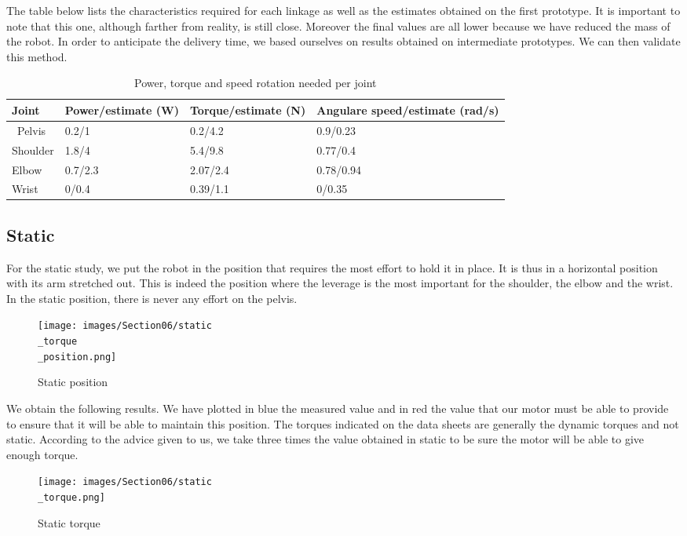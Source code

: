 \bigbreak
The table below lists the characteristics required for each linkage as well as the estimates obtained on the first prototype. It is important to note that this one, although farther from reality, is still close. Moreover the final values are all lower because we have reduced the mass of the robot. In order to anticipate the delivery time, we based ourselves on results obtained on intermediate prototypes. We can then validate this method. 

\begin{table}[ht]
    \centering
    \begin{tabular}{|p{1.5cm} | p{4cm} | p{4cm}|p{5cm} |} 
        \hline
        \textbf{Joint} & \textbf{Power/estimate (W)} & \textbf{Torque/estimate (N)}& \textbf{Angulare speed/estimate (rad/s)}\\ [0.3ex] 
        \hline\
        Pelvis & 0.2/1 & 0.2/4.2 & 0.9/0.23 \\ 
        \hline
        Shoulder & 1.8/4 & 5.4/9.8 & 0.77/0.4 \\ 
        \hline
        Elbow & 0.7/2.3 & 2.07/2.4 & 0.78/0.94 \\ 
        \hline
        Wrist & 0/0.4 & 0.39/1.1 & 0/0.35 \\ 
        \hline
    \end{tabular}
    \caption{Power, torque and speed rotation needed per joint}
\end{table}
\FloatBarrier

\subsection{Static}

For the static study, we put the robot in the position that requires the most effort to hold it in place. It is thus in a horizontal position with its arm stretched out. This is indeed the position where the leverage is the most important for the shoulder, the elbow and the wrist. In the static position, there is never any effort on the pelvis.
\begin{figure}[ht]
    \centering
    \texttt{[image: images/Section06/static\\\_torque\\\_position.png]}
    \caption{Static position}
    \label{fig:mesh15}
\end{figure}
\FloatBarrier

\bigbreak
We obtain the following results. We have plotted in blue the measured value and in red the value that our motor must be able to provide to ensure that it will be able to maintain this position. The torques indicated on the data sheets are generally the dynamic torques and not static. According to the advice given to us, we take three times the value obtained in static to be sure the motor will be able to give enough torque.
\begin{figure}[ht]
    \centering
    \texttt{[image: images/Section06/static\\\_torque.png]}
    \caption{Static torque}
    \label{fig:mesh15}
\end{figure}
\FloatBarrier

